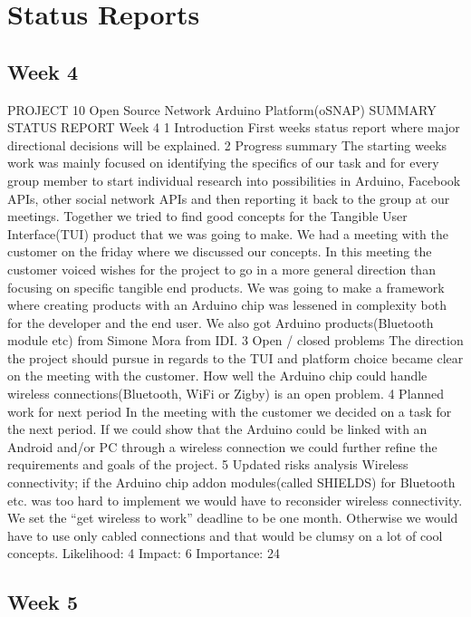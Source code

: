 
\section{Status Reports}


\subsection{Week 4}

PROJECT 10 Open Source Network Arduino Platform(oSNAP) SUMMARY STATUS
REPORT Week 4 1 Introduction First weeks status report where major
directional decisions will be explained. 2 Progress summary The starting
weeks work was mainly focused on identifying the specifics of our
task and for every group member to start individual research into
possibilities in Arduino, Facebook APIs, other social network APIs
and then reporting it back to the group at our meetings. Together
we tried to find good concepts for the Tangible User Interface(TUI)
product that we was going to make. We had a meeting with the customer
on the friday where we discussed our concepts. In this meeting the
customer voiced wishes for the project to go in a more general direction
than focusing on specific tangible end products. We was going to make
a framework where creating products with an Arduino chip was lessened
in complexity both for the developer and the end user. We also got
Arduino products(Bluetooth module etc) from Simone Mora from IDI.
3 Open / closed problems The direction the project should pursue in
regards to the TUI and platform choice became clear on the meeting
with the customer. How well the Arduino chip could handle wireless
connections(Bluetooth, WiFi or Zigby) is an open problem. 4 Planned
work for next period In the meeting with the customer we decided on
a task for the next period. If we could show that the Arduino could
be linked with an Android and/or PC through a wireless connection
we could further refine the requirements and goals of the project.
5 Updated risks analysis Wireless connectivity; if the Arduino chip
addon modules(called SHIELDS) for Bluetooth etc. was too hard to implement
we would have to reconsider wireless connectivity. We set the “get
wireless to work” deadline to be one month. Otherwise we would have
to use only cabled connections and that would be clumsy on a lot of
cool concepts. Likelihood: 4 Impact: 6 Importance: 24


\subsection{Week 5}

